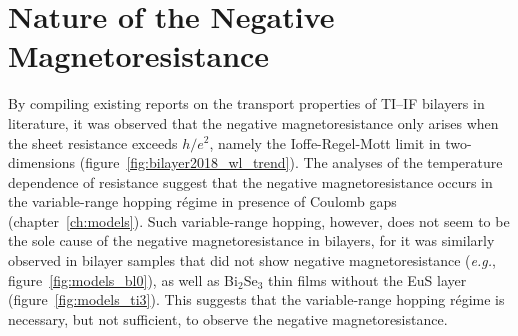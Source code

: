 \section{Nature of the Negative Magnetoresistance}
By compiling existing reports on the transport properties of TI--IF bilayers in literature, it was observed that the negative magnetoresistance only arises when the sheet resistance exceeds $h / e^2$, namely the Ioffe-Regel-Mott limit in two-dimensions (figure~\ref{fig:bilayer2018_wl_trend}). The analyses of the temperature dependence of resistance suggest that the negative magnetoresistance occurs in the variable-range hopping r\'egime in presence of Coulomb gaps (chapter~\ref{ch:models}). Such variable-range hopping, however, does not seem to be the sole cause of the negative magnetoresistance in bilayers, for it was similarly observed in bilayer samples that did not show negative magnetoresistance (\textit{e.g.}, figure~\ref{fig:models_bl0}), as well as Bi$_2$Se$_3$ thin films without the EuS layer (figure~\ref{fig:models_ti3}). This suggests that the variable-range hopping r\'egime is necessary, but not sufficient, to observe the negative magnetoresistance.
